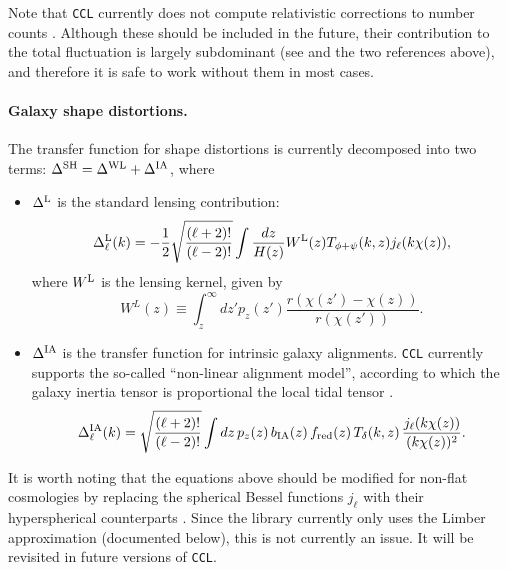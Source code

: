 \documentclass[\docopts]{\docclass}
\newcommand{\ccl}{{\tt CCL}\xspace}
\begin{document}
\begin{itemize}
        Note that \ccl currently does not compute relativistic corrections to number counts \cite{2011PhRvD..84d3516C,2011PhRvD..84f3505B}. Although these should be included in the future, their contribution to the total fluctuation is largely subdominant (see \cite{GReffects} and the two references above), and therefore it is safe to work without them in most cases.
\end{itemize}

\paragraph{\bf Galaxy shape distortions.} The transfer function for shape distortions is currently decomposed into two terms: $\Delta^{\rm SH}=\Delta^{\rm WL}+\Delta^{\rm IA}$, where
\begin{itemize}
  \item $\Delta^{\rm L}$ is the standard lensing contribution:
        \begin{equation} \label{eq:transfer_lensing}
          \Delta_\ell^{\rm L}(k)=-\frac{1}{2}\sqrt{\frac{(\ell+2)!}{(\ell-2)!}}\int \frac{dz}{H(z)} W^{\rm L}(z) T_{\phi+\psi}(k,z) j_\ell(k\chi(z)),
        \end{equation}
        where $W^{\rm L}$ is the lensing kernel, given by
        \begin{equation}
          W^L(z)\equiv\int_z^\infty dz' p_z(z')\frac{r(\chi(z')-\chi(z))}{r(\chi(z'))}.
        \end{equation}
  \item $\Delta^{\rm IA}$ is the transfer function for intrinsic galaxy alignments. \ccl currently supports the so-called ``non-linear alignment model'', according to which the galaxy inertia tensor is proportional the local tidal tensor \cite{2004PhRvD..70f3526H,2007MNRAS.381.1197H}.
        \begin{equation}
          \Delta_\ell^{\rm IA}(k)=\sqrt{\frac{(\ell+2)!}{(\ell-2)!}}\int dz\,p_z(z)\,b_{\rm IA}(z)\,f_{\rm red}(z)\,T_\delta(k,z)\,\frac{j_\ell(k\chi(z))}{(k\chi(z))^2}.
        \end{equation}
\end{itemize}

It is worth noting that the equations above should be modified for non-flat cosmologies by replacing the spherical Bessel functions $j_\ell$ with their hyperspherical counterparts \cite{1994ApJ...432....7K}. Since the library currently only uses the Limber approximation (documented below), this is not currently an issue. It will be revisited in future versions of \ccl.
\end{document}

